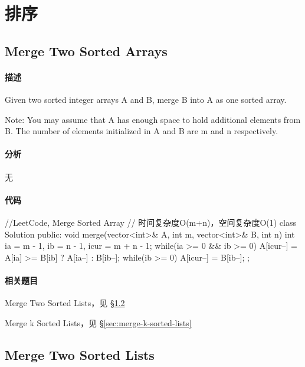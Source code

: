 \chapter{排序}

\section{Merge Two Sorted Arrays} %
\label{sec:merge-two-sorted-arrays}


\subsubsection{描述}
Given two sorted integer arrays A and B, merge B into A as one sorted array.

Note:
You may assume that A has enough space to hold additional elements from B. The number of elements initialized in A and B are m and n respectively.


\subsubsection{分析}
无


\subsubsection{代码}
\begin{Code}
//LeetCode, Merge Sorted Array
// 时间复杂度O(m+n)，空间复杂度O(1)
class Solution {
public:
    void merge(vector<int>& A, int m, vector<int>& B, int n) {
        int ia = m - 1, ib = n - 1, icur = m + n - 1;
        while(ia >= 0 && ib >= 0) {
            A[icur--] = A[ia] >= B[ib] ? A[ia--] : B[ib--];
        }
        while(ib >= 0) {
            A[icur--] = B[ib--];
        }
    }
};
\end{Code}


\subsubsection{相关题目}
\begindot
\item Merge Two Sorted Lists，见 \S \ref{sec:merge-two-sorted-lists}
\item Merge k Sorted Lists，见 \S \ref{sec:merge-k-sorted-lists}
\myenddot


\section{Merge Two Sorted Lists} %
\label{sec:merge-two-sorted-lists}


